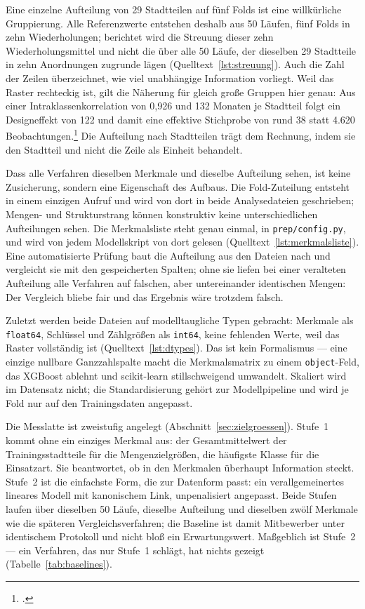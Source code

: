 Eine einzelne Aufteilung von 29 Stadtteilen auf fünf Folds ist eine
willkürliche Gruppierung. Alle Referenzwerte entstehen deshalb aus 50 Läufen,
fünf Folds in zehn Wiederholungen; berichtet wird die Streuung dieser zehn
Wiederholungsmittel und nicht die über alle 50 Läufe, der dieselben 29
Stadtteile in zehn Anordnungen zugrunde lägen
(Quelltext~\ref{lst:streuung}). Auch die Zahl der Zeilen überzeichnet, wie viel
unabhängige Information vorliegt. Weil das Raster rechteckig ist, gilt die
Näherung für gleich große Gruppen hier genau: Aus einer Intraklassenkorrelation
von 0,926 und 132 Monaten je Stadtteil folgt ein Designeffekt von 122 und damit
eine effektive Stichprobe von rund 38 statt 4.620
Beobachtungen.\footcite[206]{Killip2004} Die Aufteilung nach Stadtteilen trägt
dem Rechnung, indem sie den Stadtteil und nicht die Zeile als Einheit
behandelt.

Dass alle Verfahren dieselben Merkmale und dieselbe Aufteilung sehen, ist keine
Zusicherung, sondern eine Eigenschaft des Aufbaus. Die Fold-Zuteilung entsteht
in einem einzigen Aufruf und wird von dort in beide Analysedateien geschrieben;
Mengen- und Strukturstrang können konstruktiv keine unterschiedlichen
Aufteilungen sehen. Die Merkmalsliste steht genau einmal, in
\texttt{prep/config.py}, und wird von jedem Modellskript von dort gelesen
(Quelltext~\ref{lst:merkmalsliste}). Eine automatisierte Prüfung baut die
Aufteilung aus den Dateien nach und vergleicht sie mit den gespeicherten
Spalten; ohne sie liefen bei einer veralteten Aufteilung alle Verfahren auf
falschen, aber untereinander identischen Mengen: Der Vergleich bliebe fair und
das Ergebnis wäre trotzdem falsch.

Zuletzt werden beide Dateien auf modelltaugliche Typen gebracht: Merkmale als
\texttt{float64}, Schlüssel und Zählgrößen als \texttt{int64}, keine fehlenden
Werte, weil das Raster vollständig ist (Quelltext~\ref{lst:dtypes}). Das ist
kein Formalismus --- eine einzige nullbare Ganzzahlspalte macht die
Merkmalsmatrix zu einem \texttt{object}-Feld, das XGBoost ablehnt und
scikit-learn stillschweigend umwandelt. Skaliert wird im Datensatz nicht; die
Standardisierung gehört zur Modellpipeline und wird je Fold nur auf den
Trainingsdaten angepasst.

Die Messlatte ist zweistufig angelegt (Abschnitt~\ref{sec:zielgroessen}).
Stufe~1 kommt ohne ein einziges Merkmal aus: der Gesamtmittelwert der
Trainingsstadtteile für die Mengenzielgrößen, die häufigste Klasse für die
Einsatzart. Sie beantwortet, ob in den Merkmalen überhaupt Information steckt.
Stufe~2 ist die einfachste Form, die zur Datenform passt: ein verallgemeinertes
lineares Modell mit kanonischem Link, unpenalisiert angepasst. Beide Stufen
laufen über dieselben 50 Läufe, dieselbe Aufteilung und dieselben zwölf
Merkmale wie die späteren Vergleichsverfahren; die Baseline ist damit
Mitbewerber unter identischem Protokoll und nicht bloß ein Erwartungswert.
Maßgeblich ist Stufe~2 --- ein Verfahren, das nur Stufe~1 schlägt, hat nichts
gezeigt (Tabelle~\ref{tab:baselines}).

